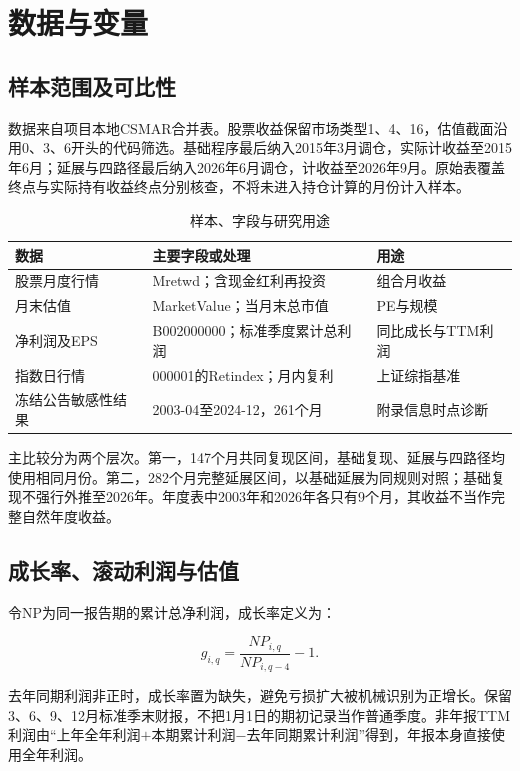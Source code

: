 
\chapter{数据与变量}
\section{样本范围及可比性}
数据来自项目本地CSMAR合并表。股票收益保留市场类型1、4、16，估值截面沿用0、3、6开头的代码筛选。基础程序最后纳入2015年3月调仓，实际计收益至2015年6月；延展与四路径最后纳入2026年6月调仓，计收益至2026年9月。原始表覆盖终点与实际持有收益终点分别核查，不将未进入持仓计算的月份计入样本。

\begin{table}[htbp]
\centering
\caption{样本、字段与研究用途}
\renewcommand{\arraystretch}{1.18}
\small
\setlength{\tabcolsep}{4.5pt}
\begin{tabularx}{\textwidth}{@{}p{2.9cm}LL@{}}
\toprule
数据 & 主要字段或处理 & 用途 \\
\midrule
股票月度行情 & Mretwd；含现金红利再投资 & 组合月收益 \\
月末估值 & MarketValue；当月末总市值 & PE与规模 \\
净利润及EPS & B002000000；标准季度累计总利润 & 同比成长与TTM利润 \\
指数日行情 & 000001的Retindex；月内复利 & 上证综指基准 \\
冻结公告敏感性结果 & 2003-04至2024-12，261个月 & 附录信息时点诊断 \\
\bottomrule
\end{tabularx}
\end{table}

主比较分为两个层次。第一，147个月共同复现区间，基础复现、延展与四路径均使用相同月份。第二，282个月完整延展区间，以基础延展为同规则对照；基础复现不强行外推至2026年。年度表中2003年和2026年各只有9个月，其收益不当作完整自然年度收益。

\section{成长率、滚动利润与估值}
令NP为同一报告期的累计总净利润，成长率定义为：

\begin{equation}
g_{i,q}=\frac{NP_{i,q}}{NP_{i,q-4}}-1.
\label{eq:growth}
\end{equation}

去年同期利润非正时，成长率置为缺失，避免亏损扩大被机械识别为正增长。保留3、6、9、12月标准季末财报，不把1月1日的期初记录当作普通季度。非年报TTM利润由“上年全年利润$+$本期累计利润$-$去年同期累计利润”得到，年报本身直接使用全年利润。

